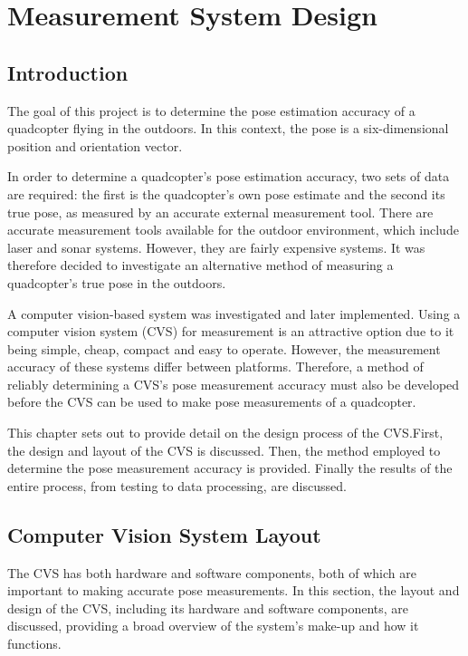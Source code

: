 \chapter{Measurement System Design}
\label{chap3}

\section{Introduction}

The goal of this project is to determine the pose estimation accuracy of a quadcopter flying in the outdoors. In this context, the pose is a six-dimensional position and orientation vector.

In order to determine a quadcopter's pose estimation accuracy, two sets of data are required: the first is the quadcopter's own pose estimate and the second its true pose, as measured by an accurate external measurement tool. There are accurate measurement tools available for the outdoor environment, which include laser and sonar systems. However, they are fairly expensive systems. It was therefore decided to investigate an alternative method of measuring a quadcopter's true pose in the outdoors.

A computer vision-based system was investigated and later implemented. Using a computer vision system (CVS) for measurement is an attractive option due to it being simple, cheap, compact and easy to operate. However, the measurement accuracy of these systems differ between platforms. Therefore, a method of reliably determining a CVS's pose measurement accuracy must also be developed before the CVS can be used to make pose measurements of a quadcopter. 

This chapter sets out to provide detail on the design process of the CVS.\@ First, the design and layout of the CVS is discussed. Then, the method employed to determine the pose measurement accuracy is provided. Finally the results of the entire process, from testing to data processing, are discussed.

\section{Computer Vision System Layout}
\label{sec:chap3-cvs-layout}

The CVS has both hardware and software components, both of which are important to making accurate pose measurements. In this section, the layout and design of the CVS, including its hardware and software components, are discussed, providing a broad overview of the system's make-up and how it functions. 

